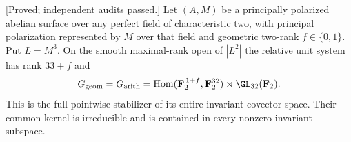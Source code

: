 \begin{theorem}
\label{thm:every-nonordinary-ppav-degree-two-full-candidate}
\textup{[Proved; independent audits passed.]}
Let $(A,M)$ be a principally polarized abelian surface over any
perfect field of characteristic two, with principal polarization
represented by $M$ over that field and geometric two-rank
$f\in\{0,1\}$. Put $L=M^3$. On the smooth maximal-rank open of
$|L^2|$ the relative unit system has rank $33+f$ and
\[
 G_{\mathrm{geom}}=G_{\mathrm{arith}}
   =\operatorname{Hom}(\mathbf F_2^{\,1+f},\mathbf F_2^{32})
                      \rtimes\GL_{32}(\mathbf F_2).
\]
This is the full pointwise stabilizer of its entire invariant
covector space. Their common kernel is irreducible and is
contained in every nonzero invariant subspace.
\end{theorem}
